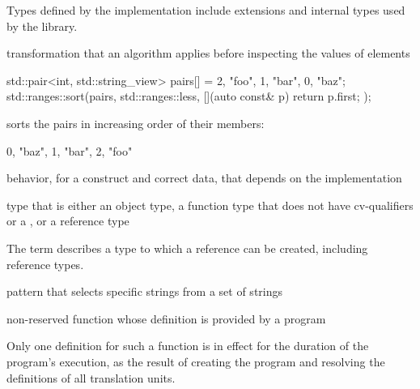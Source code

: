 \begin{defnote}
Types defined by the implementation include
extensions and internal types used by the library.
\end{defnote}

%
transformation that an algorithm applies
before inspecting the values of elements

\begin{example}
\begin{codeblock}
std::pair<int, std::string_view> pairs[] = {{2, "foo"}, {1, "bar"}, {0, "baz"}};
std::ranges::sort(pairs, std::ranges::less{}, [](auto const& p) { return p.first; });
\end{codeblock}
sorts the pairs in increasing order of their  members:
\begin{codeblock}
{{0, "baz"}, {1, "bar"}, {2, "foo"}}
\end{codeblock}
\end{example}

%
behavior, for a 
construct and correct data, that depends on the implementation

%
type that is either an
object type, a function type that does not have cv-qualifiers or a
, or a reference type

\begin{defnote}
The term describes a type to which a reference can be created,
including reference types.
\end{defnote}

pattern that selects specific strings
from a set of  strings

%
non-reserved function
whose definition is provided by a \Cpp{} program

\begin{defnote}
Only one definition for such a function is in effect for the duration of the program's
execution, as the result of creating the program and resolving the
definitions of all translation units.
\end{defnote}

